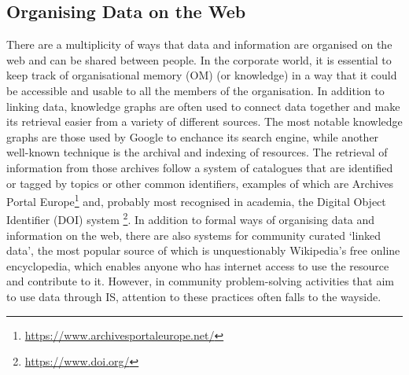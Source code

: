 \subsection{Organising Data on the Web}
\label{sub:org_data}
There are a multiplicity of ways that data and information are organised on the web and can be shared between people. In the corporate world, it is essential to keep track of organisational memory (OM) (or knowledge) \citep{tuomi_data_1999} in a way that it could be accessible and usable to all the members of the organisation. In addition to linking data, knowledge graphs are often used to connect data together and make its retrieval easier from a variety of different sources. The most notable knowledge graphs are those used by Google to enchance its search engine, while another well-known technique is the archival and indexing of resources. The retrieval of information from those archives follow a system of catalogues that are identified or tagged by topics or other common identifiers, examples of which are Archives Portal Europe\footnote{\url{https://www.archivesportaleurope.net/}} and, probably most recognised in academia, the Digital Object Identifier (DOI) system \footnote{\url{https://www.doi.org/}}. In addition to formal ways of organising data and information on the web, there are also systems for community curated `linked data', the most popular source of which is unquestionably Wikipedia's free online encyclopedia, which enables anyone who has internet access to use the resource and contribute to it. However, in community problem-solving activities that aim to use data through IS, attention to these practices often falls to the wayside.

